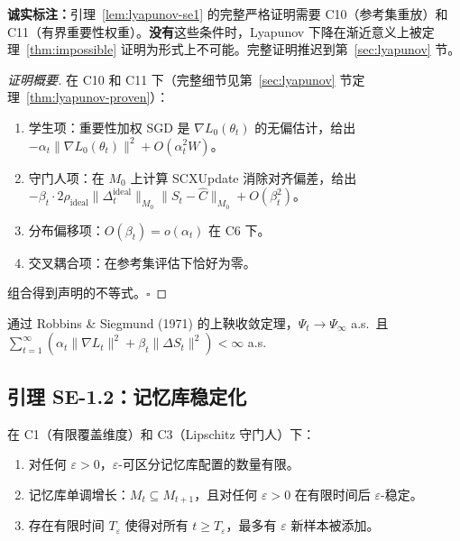 \textbf{诚实标注：}引理~\ref{lem:lyapunov-se1} 的完整严格证明需要 C10（参考集重放）和 C11（有界重要性权重）。\textbf{没有}这些条件时，Lyapunov 下降在渐近意义上被定理~\ref{thm:impossible} 证明为形式上不可能。完整证明推迟到第~\ref{sec:lyapunov} 节。

\begin{proof}[证明概要]
在 C10 和 C11 下（完整细节见第~\ref{sec:lyapunov} 节定理~\ref{thm:lyapunov-proven}）：
\begin{enumerate}[nosep]
    \item 学生项：重要性加权 SGD 是 $\nabla L_0(\theta_t)$ 的无偏估计，给出 $-\alpha_t \|\nabla L_0(\theta_t)\|^2 + O(\alpha_t^2 W)$。
    \item 守门人项：在 $M_0$ 上计算 SCXUpdate 消除对齐偏差，给出 $-\beta_t \cdot 2\rho_{\text{ideal}} \|\Delta_t^{\text{ideal}}\|_{M_0} \|S_t - \hat{C}\|_{M_0} + O(\beta_t^2)$。
    \item 分布偏移项：$O(\beta_t) = o(\alpha_t)$ 在 C6 下。
    \item 交叉耦合项：在参考集评估下恰好为零。
    \end{enumerate}
组合得到声明的不等式。\hfill $\square$
\end{proof}

通过 Robbins \& Siegmund (1971) 的上鞅收敛定理，$\Psi_t \to \Psi_\infty$ a.s.\ 且 $\sum_{t=1}^\infty (\alpha_t \|\nabla L_t\|^2 + \beta_t \|\Delta S_t\|^2) < \infty$ a.s.

\subsection{引理 SE-1.2：记忆库稳定化}

\begin{lemma}[有限记忆库配置]\label{lem:memory-stab}
在 C1（有限覆盖维度）和 C3（Lipschitz 守门人）下：
\begin{enumerate}[label=(\alph*), nosep]
    \item 对任何 $\varepsilon > 0$，$\varepsilon$-可区分记忆库配置的数量有限。
    \item 记忆库单调增长：$M_t \subseteq M_{t+1}$，且对任何 $\varepsilon > 0$ 在有限时间后 $\varepsilon$-稳定。
    \item 存在有限时间 $T_\varepsilon$ 使得对所有 $t \geq T_\varepsilon$，最多有 $\varepsilon$ 新样本被添加。
\end{enumerate}
\end{lemma}

